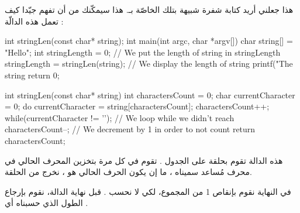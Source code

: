 هذا جعلني أريد كتابة شفرة شبيهة بتلك الخاصّة بـ. هذا سيمكّنك من أن تفهم جيّدا كيف تعمل هذه الدالّة :
\begin{Csource}
int stringLen(const char* string);
int main(int argc, char *argv[])
{
	char string[] = "Hello";
	int stringLength = 0;
	// We put the length of string in stringLength
	stringLength = stringLen(string);
	// We display the length of string
	printf("The string %
	return 0;
}

int stringLen(const char* string)
{
	int charactersCount = 0;
	char currentCharacter = 0;
	do
	{
    	 	currentCharacter = string[charactersCount];
    	 	charactersCount++;
	}
	while(currentCharacter != '\0'); // We loop while we didn’t reach \0
	charactersCount--; // We decrement by 1 in order to not count \0
	return charactersCount;
}
\end{Csource}
هذه الدالة
تقوم بحلقة على الجدول
.
تقوم في كل مرة بتخزين المحرف الحالي في محرف مُساعد سميناه
،
ما إن يكون الحرف الحالي هو
،
نخرج من الحلقة.

في النهاية نقوم بإنقاص 1 من المجموع، لكي لا نحسب
.
 قبل نهاية الدالة، نقوم بإرجاع الطول الذي حسبناه أي
.

